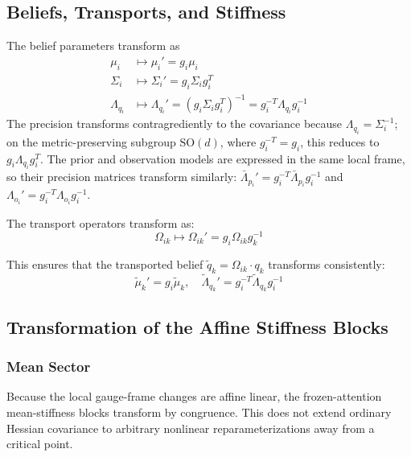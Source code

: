 \documentclass[12pt]{article}
\begin{document}
\subsection{Beliefs, Transports, and Stiffness}
The belief parameters transform as
\begin{align}
\mu_i &\mapsto \mu_i' = g_i \mu_i \\
\Sigma_i &\mapsto \Sigma_i' = g_i \Sigma_i g_i^T \\
\Lambda_{q_i} &\mapsto \Lambda_{q_i}' = (g_i \Sigma_i g_i^T)^{-1} = g_i^{-T} \Lambda_{q_i} g_i^{-1}
\end{align}
The precision transforms contragrediently to the covariance because $\Lambda_{q_i} = \Sigma_i^{-1}$; on the metric-preserving subgroup $\mathrm{SO}(d)$, where $g_i^{-T} = g_i$, this reduces to $g_i \Lambda_{q_i} g_i^T$.
The prior and observation models are expressed in the same local frame, so their precision matrices transform similarly: $\bar\Lambda_{p_i}'=g_i^{-T}\bar\Lambda_{p_i}g_i^{-1}$ and $\Lambda_{o_i}'=g_i^{-T}\Lambda_{o_i}g_i^{-1}$.

The transport operators transform as:
\begin{equation}
\Omega_{ik} \mapsto \Omega_{ik}' = g_i \Omega_{ik} g_k^{-1}
\end{equation}

This ensures that the transported belief $\tilde{q}_k = \Omega_{ik}\cdot q_k$ transforms consistently:
\begin{equation}
\tilde{\mu}_k' = g_i \tilde{\mu}_k, \quad \tilde{\Lambda}_{q_k}' = g_i^{-T} \tilde{\Lambda}_{q_k} g_i^{-1}
\end{equation}

\subsection{Transformation of the Affine Stiffness Blocks}

\subsubsection{Mean Sector}

Because the local gauge-frame changes are affine linear, the frozen-attention mean-stiffness blocks transform by congruence. This does not extend ordinary Hessian covariance to arbitrary nonlinear reparameterizations away from a critical point.
\end{document}
